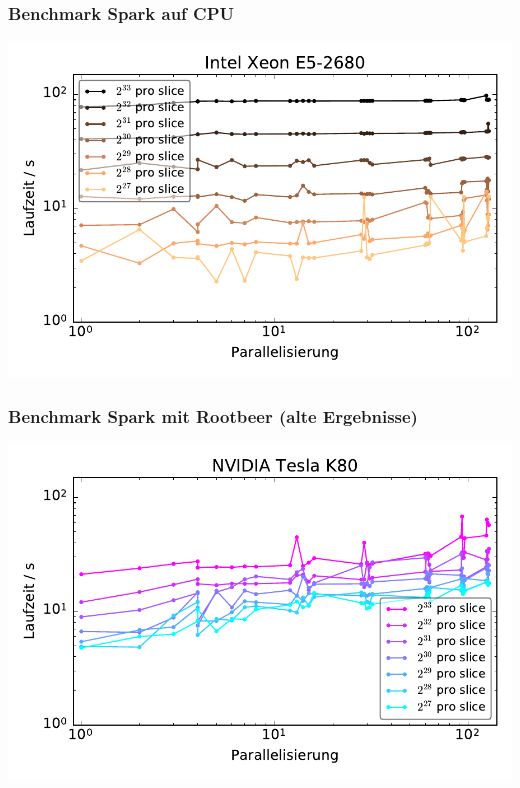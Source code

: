 \begin{frame}
    \frametitle{Benchmark Spark auf CPU}
    \centerline{\includegraphics[width=0.9\linewidth]{cluster-strong-scaling-cpu.pdf}}
\end{frame}


\begin{frame}
    \frametitle{Benchmark Spark mit Rootbeer (alte Ergebnisse)}
    \centerline{\includegraphics[width=0.9\linewidth]{cluster-strong-scaling-gpu.pdf}}
\end{frame}



